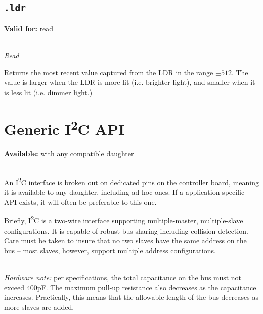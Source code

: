 \documentclass{article}
\begin{document}
\subsection{\texttt{.ldr}}
\textbf{Valid for:} read

~\\
\textit{Read}

Returns the most recent value captured from the LDR in the range $\pm512$. The value is larger when the LDR is more lit (i.e. brighter light), and smaller when it is less lit (i.e. dimmer light.)

%
%
%

\section{Generic I\textsuperscript{2}C API}
\textbf{Available:} with any compatible daughter

~\\
An I\textsuperscript{2}C interface is broken out on dedicated pins on the controller board, meaning it is available to any daughter, including ad-hoc ones. If a application-specific API exists, it will often be preferable to this one.

Briefly, I\textsuperscript{2}C is a two-wire interface supporting multiple-master, multiple-slave configurations. It is capable of robust bus sharing including collision detection. Care must be taken to insure that no two slaves have the same address on the bus -- most slaves, however, support multiple address configurations.

~\\
\textit{Hardware note:} per specifications, the total capacitance on the bus must not exceed 400pF. The maximum pull-up resistance also decreases as the capacitance increases. Practically, this means that the allowable length of the bus decreases as more slaves are added.
\end{document}
